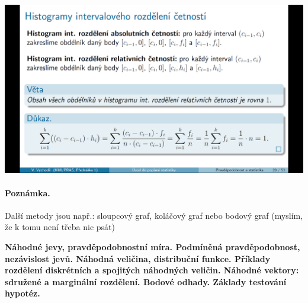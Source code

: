 \documentclass[12pt,a4paper]{article}
\begin{document}
\begin{center}
	\includegraphics[scale=0.32]{img/graficke_metody_intervalove_rozdeleni_histogramy}
\end{center}
\paragraph{Poznámka.} Další metody jsou např.: sloupcový graf, koláčový graf nebo bodový graf (myslím, že k tomu není třeba nic psát)



\newpage
\textbf{Náhodné jevy, pravděpodobnostní míra. Podmíněná pravděpodobnost, nezávislost jevů. Náhodná veličina, distribuční
funkce. Příklady rozdělení diskrétních a spojitých náhodných veličin. Náhodné vektory: sdružené a
marginální rozdělení. Bodové odhady. Základy testování hypotéz.}
\end{document}

